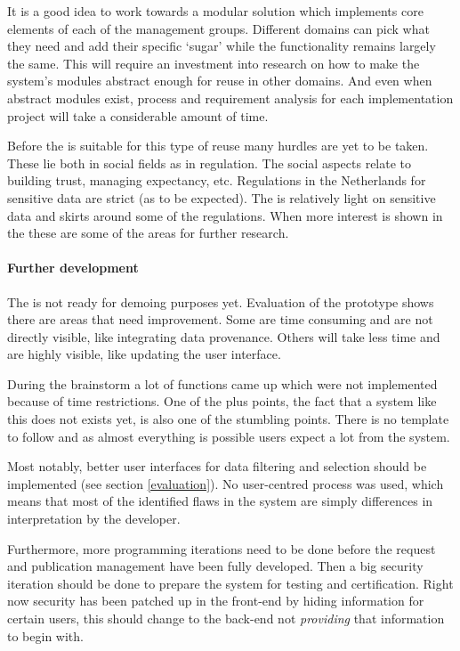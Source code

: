 It is a good idea to work towards a modular solution which implements core elements of each of the management groups.
Different domains can pick what they need and add their specific `sugar' while the functionality remains largely the same.
This will require an investment into research on how to make the system's modules abstract enough for reuse in other domains.
And even when abstract modules exist, process and requirement analysis for each implementation project will take a considerable amount of time.

Before the \ivfsystem{} is suitable for this type of reuse many hurdles are yet to be taken.
These lie both in social fields as in regulation.
The social aspects relate to building trust, managing expectancy, etc.
Regulations in the Netherlands for sensitive data are strict (as to be expected).
The \projectdata{} is relatively light on sensitive data and skirts around some of the regulations.
When more interest is shown in the \ivfsystem{} these are some of the areas for further research.

\paragraph{Further development}
The \ivfsystem{} is not ready for demoing purposes yet.
Evaluation of the prototype shows there are areas that need improvement.
Some are time consuming and are not directly visible, like integrating data provenance.
Others will take less time and are highly visible, like updating the user interface.

During the brainstorm a lot of functions came up which were not implemented because of time restrictions.
One of the plus points, the fact that a system like this does not exists yet, is also one of the stumbling points.
There is no template to follow and as almost everything is possible users expect a lot from the system.

Most notably, better user interfaces for data filtering and selection should be implemented (see section \ref{evaluation}).
No user-centred process was used, which means that most of the identified flaws in the system are simply differences in interpretation by the developer.

Furthermore, more programming iterations need to be done before the request and publication management have been fully developed.
Then a big security iteration should be done to prepare the system for testing and certification.
Right now security has been patched up in the front-end by hiding information for certain users, this should change to the back-end not \emph{providing} that information to begin with.

